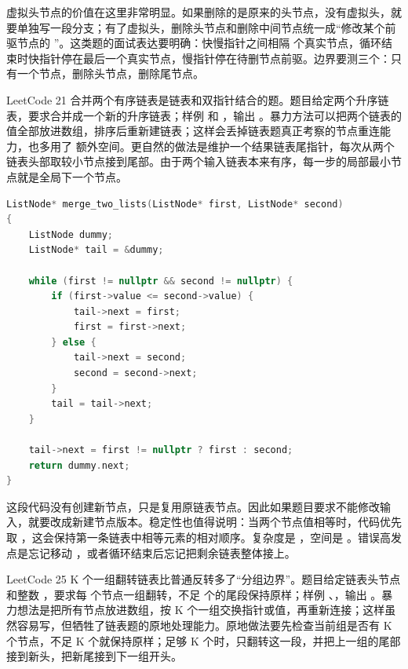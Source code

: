 虚拟头节点的价值在这里非常明显。如果删除的是原来的头节点，没有虚拟头，就要单独写一段分支；有了虚拟头，删除头节点和删除中间节点统一成“修改某个前驱节点的 ”。这类题的面试表达要明确：快慢指针之间相隔  个真实节点，循环结束时快指针停在最后一个真实节点，慢指针停在待删节点前驱。边界要测三个：只有一个节点，删除头节点，删除尾节点。

LeetCode 21 合并两个有序链表是链表和双指针结合的题。题目给定两个升序链表，要求合并成一个新的升序链表；样例  和 ，输出 。暴力方法可以把两个链表的值全部放进数组，排序后重新建链表；这样会丢掉链表题真正考察的节点重连能力，也多用了  额外空间。更自然的做法是维护一个结果链表尾指针，每次从两个链表头部取较小节点接到尾部。由于两个输入链表本来有序，每一步的局部最小节点就是全局下一个节点。

\begin{lstlisting}[language=C++,caption={LeetCode 21 合并两个有序链表：尾指针接入节点}]
ListNode* merge_two_lists(ListNode* first, ListNode* second)
{
    ListNode dummy;
    ListNode* tail = &dummy;

    while (first != nullptr && second != nullptr) {
        if (first->value <= second->value) {
            tail->next = first;
            first = first->next;
        } else {
            tail->next = second;
            second = second->next;
        }
        tail = tail->next;
    }

    tail->next = first != nullptr ? first : second;
    return dummy.next;
}
\end{lstlisting}

这段代码没有创建新节点，只是复用原链表节点。因此如果题目要求不能修改输入，就要改成新建节点版本。稳定性也值得说明：当两个节点值相等时，代码优先取 ，这会保持第一条链表中相等元素的相对顺序。复杂度是 ，空间是 。错误高发点是忘记移动 ，或者循环结束后忘记把剩余链表整体接上。

LeetCode 25 K 个一组翻转链表比普通反转多了“分组边界”。题目给定链表头节点和整数 ，要求每  个节点一组翻转，不足  个的尾段保持原样；样例 、，输出 。暴力想法是把所有节点放进数组，按 K 个一组交换指针或值，再重新连接；这样虽然容易写，但牺牲了链表题的原地处理能力。原地做法要先检查当前组是否有 K 个节点，不足 K 个就保持原样；足够 K 个时，只翻转这一段，并把上一组的尾部接到新头，把新尾接到下一组开头。

